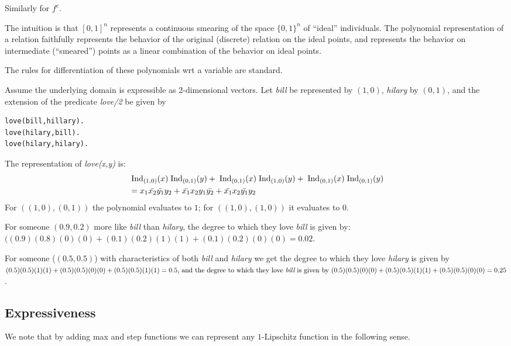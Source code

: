 \documentclass{article} %
\begin{document}
Similarly for $f^c$. 

The intuition is that $[0,1]^n$ represents a continuous smearing of the space $\{0,1\}^n$ of ``ideal'' individuals. The polynomial representation of a relation faithfully represents the behavior of the original (discrete) relation on the ideal points, and represents the behavior on intermediate (``smeared'') points as a linear combination of the behavior on ideal points.

The rules for differentiation of these polynomials wrt a variable are standard. 

\begin{example}
Assume the underlying domain is expressible as 2-dimensional vectors. Let {\em bill} be represented by \((1, 0)\), {\em hilary} by \((0,1)\), and the extension of the predicate {\em love/2} be given by
\begin{lstlisting}
love(bill,hillary).
love(hilary,bill).
love(hilary,hilary).
\end{lstlisting}
The representation of {\em love(x,y)} is:
\begin{align*}
&\;\mbox{Ind}_{(1,0)}(x)\;\mbox{Ind}_{(0,1)}(y) + \;\mbox{Ind}_{(0,1)}(x)\;\mbox{Ind}_{(1,0)}(y) + \;\mbox{Ind}_{(0,1)}(x)\;\mbox{Ind}_{(0,1)}(y)  \\
&= x_1\bar{x_2}\bar{y_1}y_2 + \bar{x_1}x_2y_1\bar{y_2} + \bar{x_1}x_2\bar{y_1}y_2
\end{align*}
For \(((1,0),(0,1))\) the polynomial evaluates to \(1\); for \(((1,0),(1,0))\) it evaluates to \(0\). 

For someone \((0.9,0.2)\) more like {\em bill} than {\em hilary}, the degree to which they love
{\em bill} is given by: 
\(((0.9)(0.8)(0)(0) + (0.1)(0.2)(1)(1) + (0.1)(0.2)(0)(0)=0.02\).

For someone (\((0.5,0.5)\)) with characteristics of both {\em bill} and {\em hilary} we get the degree to which they love {\em hilary}  is given by
\((0.5)(0.5)(1)(1)+(0.5)(0.5)(0)(0)+(0.5)(0.5)(1)(1)=0.5$, and the degree to which they love {\em bill} is given by $(0.5)(0.5)(0)(0) + (0.5)(0.5)(1)(1) + (0.5)(0.5)(0)(0)=0.25\).

\end{example}

\subsection{Expressiveness}
We note that by adding max and step functions we can represent any $1$-Lipschitz function in the following sense.
\end{document}
